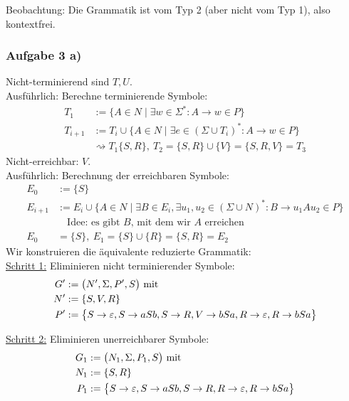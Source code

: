 Beobachtung: Die Grammatik ist vom Typ 2 (aber nicht vom Typ 1), also kontextfrei.
	
\subsubsection{Aufgabe 3 a)}

\begin{lösung}
	Nicht-terminierend sind $T,U$.\\
	Ausführlich: Berechne terminierende Symbole:
	\begin{align*}
		T_1&:=\big\lbrace A\in N\mid\exists w\in\Sigma^\ast:A\to w\in P\big\rbrace\\
		T_{i+1}&:=T_i\cup\big\lbrace A\in N\mid\exists e\in (\Sigma\cup T_i)^\ast:A\to w\in P\big\rbrace\\
		&\rightsquigarrow T_1\lbrace S,R\rbrace,~T_2=\lbrace S,R\rbrace\cup\lbrace V\rbrace=\lbrace S,R,V\rbrace=T_3
	\end{align*}
	Nicht-erreichbar: $V$.\\
	Ausführlich: Berechnung der erreichbaren Symbole:
	\begin{align*}
		E_0&:=\lbrace S\rbrace\\
		E_{i+1}&:=E_i\cup\big\lbrace A\in N\mid \exists B\in E_i,\exists u_1,u_2\in(\Sigma\cup N)^\ast:B\to u_1 Au_2\in P\big\rbrace\\
		&\quad\text{Idee: es gibt $B$, mit dem wir $A$ erreichen}\\
		E_0&=\lbrace S\rbrace,~E_1=\lbrace S\rbrace\cup\lbrace R\rbrace=\lbrace S,R\rbrace=E_2
	\end{align*}
	Wir konstruieren die äquivalente reduzierte Grammatik:\\
	\underline{Schritt 1:} Eliminieren nicht terminierender Symbole:
	\begin{align*}
		G'&:=\big(N',\Sigma,P',S\big)\mit\\
		N'&:=\lbrace S,V,R\rbrace\\
		P'&:=\big\lbrace
			S\to\varepsilon, S\to aSb,S\to R,V\to bSa,R\to\varepsilon,R\to bSa
		\big\rbrace
	\end{align*}
	
	\underline{Schritt 2:} Eliminieren unerreichbarer Symbole:
	\begin{align*}
		G_1&:=\big(N_1,\Sigma,P_1,S\big)\mit\\
		N_1&:=\lbrace S,R\rbrace\\
		P_1&:=\big\lbrace
			S\to\varepsilon, S\to aSb,S\to R,R\to\varepsilon,R\to bSa
		\big\rbrace
	\end{align*}
\end{lösung}


